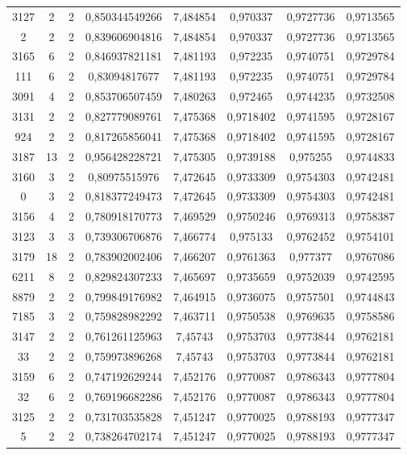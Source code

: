 \begin{longtable}{|c|c|c|c|c|c|c|c|}
3127 & 2 & 2 & 0,850344549266 & 7,484854 & 0,970337 & 0,9727736 & 0,9713565 \\
2 & 2 & 2 & 0,839606904816 & 7,484854 & 0,970337 & 0,9727736 & 0,9713565 \\
3165 & 6 & 2 & 0,846937821181 & 7,481193 & 0,972235 & 0,9740751 & 0,9729784 \\
111 & 6 & 2 & 0,83094817677 & 7,481193 & 0,972235 & 0,9740751 & 0,9729784 \\
3091 & 4 & 2 & 0,853706507459 & 7,480263 & 0,972465 & 0,9744235 & 0,9732508 \\
3131 & 2 & 2 & 0,827779089761 & 7,475368 & 0,9718402 & 0,9741595 & 0,9728167 \\
924 & 2 & 2 & 0,817265856041 & 7,475368 & 0,9718402 & 0,9741595 & 0,9728167 \\
3187 & 13 & 2 & 0,956428228721 & 7,475305 & 0,9739188 & 0,975255 & 0,9744833 \\
3160 & 3 & 2 & 0,80975515976 & 7,472645 & 0,9733309 & 0,9754303 & 0,9742481 \\
0 & 3 & 2 & 0,818377249473 & 7,472645 & 0,9733309 & 0,9754303 & 0,9742481 \\
3156 & 4 & 2 & 0,780918170773 & 7,469529 & 0,9750246 & 0,9769313 & 0,9758387 \\
3123 & 3 & 3 & 0,739306706876 & 7,466774 & 0,975133 & 0,9762452 & 0,9754101 \\
3179 & 18 & 2 & 0,783902002406 & 7,466207 & 0,9761363 & 0,977377 & 0,9767086 \\
6211 & 8 & 2 & 0,829824307233 & 7,465697 & 0,9735659 & 0,9752039 & 0,9742595 \\
8879 & 2 & 2 & 0,799849176982 & 7,464915 & 0,9736075 & 0,9757501 & 0,9744843 \\
7185 & 3 & 2 & 0,759828982292 & 7,463711 & 0,9750538 & 0,9769635 & 0,9758586 \\
3147 & 2 & 2 & 0,761261125963 & 7,45743 & 0,9753703 & 0,9773844 & 0,9762181 \\
33 & 2 & 2 & 0,759973896268 & 7,45743 & 0,9753703 & 0,9773844 & 0,9762181 \\
3159 & 6 & 2 & 0,747192629244 & 7,452176 & 0,9770087 & 0,9786343 & 0,9777804 \\
32 & 6 & 2 & 0,769196682286 & 7,452176 & 0,9770087 & 0,9786343 & 0,9777804 \\
3125 & 2 & 2 & 0,731703535828 & 7,451247 & 0,9770025 & 0,9788193 & 0,9777347 \\
5 & 2 & 2 & 0,738264702174 & 7,451247 & 0,9770025 & 0,9788193 & 0,9777347 \\

\end{longtable}
